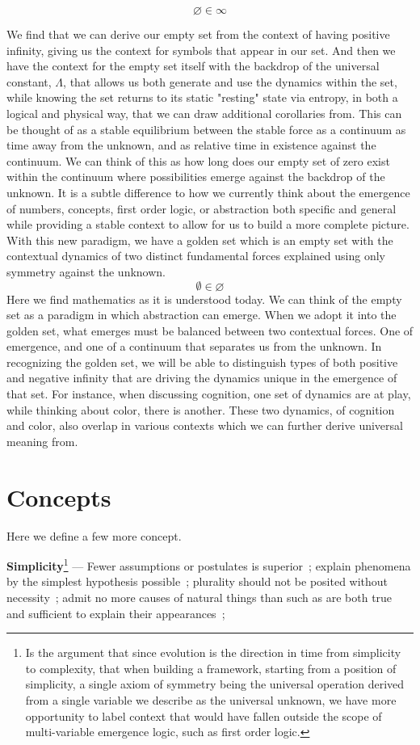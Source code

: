 \documentclass[11pt]{article}
\newcommand{\goldenset}{\varnothing}
\begin{document}
\[     
    \goldenset \in \infty
\]

We find that we can derive our empty set from the context of having positive infinity, giving us the context for symbols that appear in our set. And then we have the context for the empty set itself with the backdrop of the universal constant, \( \Lambda \), that allows us both generate and use the dynamics within the set, while knowing the set returns to its static "resting" state via entropy, in both a logical and physical way, that we can draw additional corollaries from. This can be thought of as a stable equilibrium between the stable force as a continuum as time away from the unknown, and as relative time in existence against the continuum. We can think of this as how long does our empty set of zero exist within the continuum where possibilities emerge against the backdrop of the unknown. It is a subtle difference to how we currently think about the emergence of numbers, concepts, first order logic, or abstraction both specific and general while providing a stable context to allow for us to build a more complete picture. With this new paradigm, we have a golden set which is an empty set with the contextual dynamics of two distinct fundamental forces explained using only symmetry against the unknown. 
\[     
    \emptyset \in \goldenset
\]
Here we find mathematics as it is understood today. We can think of the empty set as a paradigm in which abstraction can emerge. When we adopt it into the golden set, what emerges must be balanced between two contextual forces. One of emergence, and one of a continuum that separates us from the unknown. In recognizing the golden set, we will be able to distinguish types of both positive and negative infinity that are driving the dynamics unique in the emergence of that set. For instance, when discussing cognition, one set of dynamics are at play, while thinking about color, there is another. These two dynamics, of cognition and color, also overlap in various contexts which we can further derive universal meaning from.
\newpage
\section*{Concepts}

Here we define a few more concept.
    
\textbf{Simplicity}\label{def:simplicity}\footnote{Is the argument that since evolution is the direction in time from simplicity to complexity, that when building a framework, starting from a position of simplicity, 
a single axiom of symmetry being the universal operation derived from a single variable we describe as the universal unknown, 
we have more opportunity to label context that would have fallen outside the scope of multi-variable emergence logic, 
such as first order logic.} --- Fewer assumptions or postulates is superior~\cite{AristotlePosteriorAnalytics}; explain phenomena by the simplest hypothesis possible~\cite{Ptolemy150}; plurality should not be posited without necessity~\cite{Ockham1323}; admit no more causes of natural things than such as are both true and sufficient to explain their appearances~\cite{NewtonPrincipiaRule1};
\end{document}
